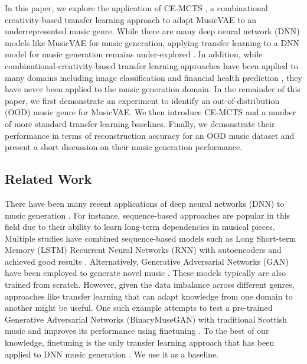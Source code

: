 \documentclass[letterpaper]{article}
\begin{document}
In this paper, we explore the application of CE-MCTS \cite{Mahajan2023}, a combinational creativity-based transfer learning approach to adapt MusicVAE to an underrepresented music genre.
While there are many deep neural network (DNN) models like MusicVAE for music generation, applying transfer learning to a DNN model for music generation remains under-explored \cite{svegliato2016deep,marchetti2021convolutional}.
In addition, while combinational-creativity-based transfer learning approaches have been applied to many domains including image classification \cite{banerjee2021combinets} and financial health prediction \cite{Mahajan2023}, they have never been applied to the music generation domain.
In the remainder of this paper, we first demonstrate an experiment to identify an out-of-distribution (OOD) music genre for MusicVAE. 
We then introduce CE-MCTS and a number of more standard transfer learning baselines. 
Finally, we demonstrate their performance in terms of reconstruction accuracy for an OOD music dataset and present a short discussion on their music generation performance. 

\subsection{Related Work}

There have been many recent applications of deep neural networks (DNN) to music generation \cite{CIVIT2022118190}. For instance, sequence-based approaches are popular in this field due to their ability to learn long-term dependencies in musical pieces. Multiple studies have combined sequence-based models such as Long Short-term Memory (LSTM) Recurrent Neural Networks (RNN) with autoencoders and achieved good results \cite{perfrnn2017}. Alternatively, Generative Adversarial Networks (GAN) have been employed to generate novel music \cite{yang2017midinet}. 
These models typically are also trained from scratch. However, given  the data imbalance across different genres, approaches like transfer learning that can adapt knowledge from one domain to another might be useful. One such example attempts to test a pre-trained Generative Adversarial Networks (BinaryMuseGAN) with traditional Scottish music and improves its performance using finetuning \cite{marchetti2021convolutional}. To the best of our knowledge, finetuning is the only transfer learning approach that has been applied to DNN music generation \cite{svegliato2016deep}. 
We use it as a baseline.
\end{document}

